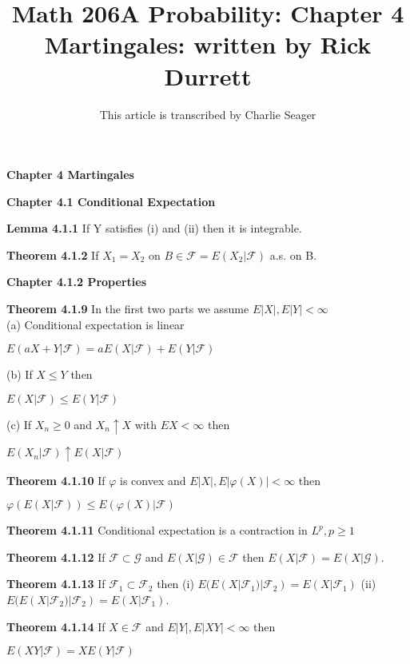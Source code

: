 \documentclass{article}
\begin{document}
\title{Math 206A Probability: Chapter 4 Martingales: written by Rick Durrett}
\author{This article is transcribed by Charlie Seager}

\maketitle

\textbf {Chapter 4 Martingales}

\textbf {Chapter 4.1 Conditional Expectation}

\textbf {Lemma 4.1.1} If Y satisfies (i) and (ii) then it is integrable.

\textbf {Theorem 4.1.2} If $X_1 = X_2$ on $B \in \mathcal{F} = E(X_2|\mathcal{F})$ a.s. on B.

\textbf {Chapter 4.1.2 Properties}

\textbf {Theorem 4.1.9} In the first two parts we assume $E|X|, E|Y| < \infty$ \\ 
(a) Conditional expectation is linear
\begin{center}
$E(aX + Y| \mathcal{F}) = aE(X|\mathcal{F}) + E(Y|\mathcal{F})$
\end{center} 
(b) If $X \leq Y$ then
\begin{center}
$E(X|\mathcal{F}) \leq E(Y|\mathcal{F})$
\end{center}
(c) If $X_n \geq 0$ and $X_n \uparrow  X$ with $EX < \infty$ then 
\begin{center}
$E(X_n|\mathcal{F}) \uparrow E(X|\mathcal{F})$
\end{center}

\textbf {Theorem 4.1.10} If $\varphi$ is convex and $E|X|, E|\varphi(X)| < \infty$ then 
\begin{center}
$\varphi(E(X|\mathcal{F})) \leq E(\varphi(X)|\mathcal{F})$
\end{center}

\textbf {Theorem 4.1.11} Conditional expectation is a contraction in $L^p, p \geq 1$

\textbf {Theorem 4.1.12} If $\mathcal{F} \subset \mathcal{G}$ and $E(X|\mathcal{G}) \in \mathcal{F}$ then $E(X|\mathcal{F}) = E(X|\mathcal{G})$.

\textbf {Theorem 4.1.13} If $\mathcal{F}_1 \subset \mathcal{F}_2$ then (i) $E(E(X|\mathcal{F}_1)|\mathcal{F}_2) = E(X|\mathcal{F}_1)$ (ii) $E(E(X|\mathcal{F}_2)|\mathcal{F}_2) = E(X|\mathcal{F}_1)$.

\textbf {Theorem 4.1.14} If $X \in \mathcal{F}$ and $E|Y|, E|XY| < \infty$ then 
\begin{center}
$E(XY|\mathcal{F}) = XE(Y|\mathcal{F})$
\end{center}
\end{document}
